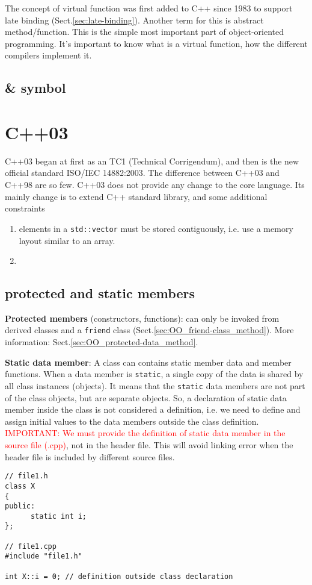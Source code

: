 The concept of virtual function was first added to C++ since 1983 to support
late binding (Sect.\ref{sec:late-binding}).
Another term for this is abstract method/function. This is the simple most
important part of object-oriented programming. It's important to know what is a
virtual function, how the different compilers implement it.


\subsection{\& symbol}
\label{sec:&_operator}


\section{C++03}

C++03 began at first as an TC1 (Technical Corrigendum), and then is the new
official standard ISO/IEC 14882:2003.  The difference between C++03 and C++98
are so few. C++03 does not provide any change to the core language.
Its mainly change is to extend C++ standard library, and some additional
constraints
\begin{enumerate}
  \item elements in a \verb!std::vector! must be stored contiguously, i.e. use a
  memory layout similar to an array.
  
  \item 
\end{enumerate}

\subsection{protected and static members}
\label{sec:C++03_protected-functions_static-functions}

{\bf Protected members} (constructors, functions): can only be invoked from
derived classes and a \verb!friend! class
(Sect.\ref{sec:OO_friend-class_method}). More information:
Sect.\ref{sec:OO_protected-data_method}.



{\bf Static data member}: A class can contains static member data and member
functions. When a data member is \verb!static!, a single copy of the data is
shared by all class instances (objects). It means that the \verb!static! data
members are not part of the class objects, but are separate objects. So, a
declaration of static data member inside the class is not considered a
definition, i.e. we need to define and assign initial values to the data members
outside the class definition. \textcolor{red}{IMPORTANT: We must provide the
definition of static data member in the source file (.cpp)}, not in the header
file. This will avoid linking error when the header file is included by
different source files.
\begin{verbatim}
// file1.h
class X
{
public:
      static int i;
};

// file1.cpp
#include "file1.h"

int X::i = 0; // definition outside class declaration
\end{verbatim}


